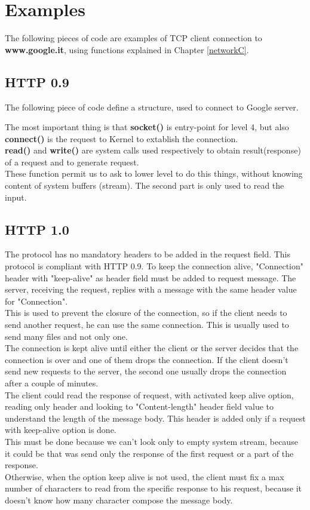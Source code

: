 \vspace{10cm}
\section{Examples}
The following pieces of code are examples of TCP client connection to \textbf{www.google.it}, using functions explained in Chapter \ref{networkC}.
\subsection{HTTP 0.9}
The following piece of code define a structure, used to connect to Google server. 

The most important thing is that \textbf{socket()} is entry-point for level 4, but also \textbf{connect()} is the request to Kernel to extablish the connection.\\ \textbf{read()} and \textbf{write()} are system calls used respectively to obtain result(response) of a request and to generate request.\\ These function permit us to ask to lower level to do this things, without knowing content of system buffers (stream). The second part is only used to read the input.

\subsection{HTTP 1.0}
The protocol has no mandatory headers to be added in the request field. This protocol is compliant with HTTP 0.9.
To keep the connection alive, "Connection" header with "keep-alive" as header field must be added to request message. The server, receiving the request, replies with a message with the same header value for "Connection".\\
This is used to prevent the closure of the connection, so if the client needs to send another request, he can use the same connection.
This is usually used to send many files and not only one.\\
The connection is kept alive until either the client or the server decides that the connection is over and one of them drops the connection. If the client doesn't send new requests to the server, the second one usually drops the connection after a couple of minutes.\\
The client could read the response of request, with activated keep alive option, reading only header and looking to "Content-length" header field value to understand the length of the message body. This header is added only if a request with keep-alive option is done.\\
This must be done because we can't look only to empty system stream, because it could be that was send only the response of the first request or a part of the response.\\
Otherwise, when the option keep alive is not used, the client must fix a max number of characters to read from the specific response to his request, because it doesn't know how many character compose the message body.

